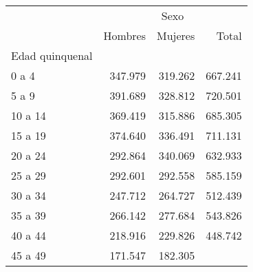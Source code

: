 \begin{tabular}{llll}
\cline{1-4}
\multicolumn{1}{c}{} &
  \multicolumn{3}{|c}{Sexo} \\
\multicolumn{1}{c}{} &
  \multicolumn{1}{|r}{Hombres} &
  \multicolumn{1}{r}{Mujeres} &
  \multicolumn{1}{r}{Total} \\
\cline{1-4}
\multicolumn{1}{l}{Edad quinquenal} &
  \multicolumn{1}{|r}{} &
  \multicolumn{1}{r}{} &
  \multicolumn{1}{r}{} \\
\multicolumn{1}{l}{\hspace{1em}0 a 4} &
  \multicolumn{1}{|r}{347.979} &
  \multicolumn{1}{r}{319.262} &
  \multicolumn{1}{r}{667.241} \\
\multicolumn{1}{l}{\hspace{1em}5 a 9} &
  \multicolumn{1}{|r}{391.689} &
  \multicolumn{1}{r}{328.812} &
  \multicolumn{1}{r}{720.501} \\
\multicolumn{1}{l}{\hspace{1em}10 a 14} &
  \multicolumn{1}{|r}{369.419} &
  \multicolumn{1}{r}{315.886} &
  \multicolumn{1}{r}{685.305} \\
\multicolumn{1}{l}{\hspace{1em}15 a 19} &
  \multicolumn{1}{|r}{374.640} &
  \multicolumn{1}{r}{336.491} &
  \multicolumn{1}{r}{711.131} \\
\multicolumn{1}{l}{\hspace{1em}20 a 24} &
  \multicolumn{1}{|r}{292.864} &
  \multicolumn{1}{r}{340.069} &
  \multicolumn{1}{r}{632.933} \\
\multicolumn{1}{l}{\hspace{1em}25 a 29} &
  \multicolumn{1}{|r}{292.601} &
  \multicolumn{1}{r}{292.558} &
  \multicolumn{1}{r}{585.159} \\
\multicolumn{1}{l}{\hspace{1em}30 a 34} &
  \multicolumn{1}{|r}{247.712} &
  \multicolumn{1}{r}{264.727} &
  \multicolumn{1}{r}{512.439} \\
\multicolumn{1}{l}{\hspace{1em}35 a 39} &
  \multicolumn{1}{|r}{266.142} &
  \multicolumn{1}{r}{277.684} &
  \multicolumn{1}{r}{543.826} \\
\multicolumn{1}{l}{\hspace{1em}40 a 44} &
  \multicolumn{1}{|r}{218.916} &
  \multicolumn{1}{r}{229.826} &
  \multicolumn{1}{r}{448.742} \\
\multicolumn{1}{l}{\hspace{1em}45 a 49} &
  \multicolumn{1}{|r}{171.547} &
  \multicolumn{1}{r}{182.305} &

\end{tabular}
